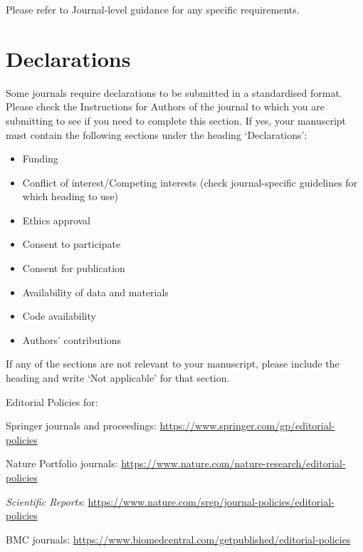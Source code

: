 \documentclass[sn-mathphys]{sn-jnl}%
\begin{document}
Please refer to Journal-level guidance for any specific requirements.

\section*{Declarations}

Some journals require declarations to be submitted in a standardised format. Please check the Instructions for Authors of the journal to which you are submitting to see if you need to complete this section. If yes, your manuscript must contain the following sections under the heading `Declarations':

\begin{itemize}
\item Funding
\item Conflict of interest/Competing interests (check journal-specific guidelines for which heading to use)
\item Ethics approval 
\item Consent to participate
\item Consent for publication
\item Availability of data and materials
\item Code availability 
\item Authors' contributions
\end{itemize}

\noindent
If any of the sections are not relevant to your manuscript, please include the heading and write `Not applicable' for that section. 

\bigskip
\begin{flushleft}%
Editorial Policies for:

\bigskip\noindent
Springer journals and proceedings: \url{https://www.springer.com/gp/editorial-policies}

\bigskip\noindent
Nature Portfolio journals: \url{https://www.nature.com/nature-research/editorial-policies}

\bigskip\noindent
\textit{Scientific Reports}: \url{https://www.nature.com/srep/journal-policies/editorial-policies}

\bigskip\noindent
BMC journals: \url{https://www.biomedcentral.com/getpublished/editorial-policies}
\end{flushleft}
\end{document}
